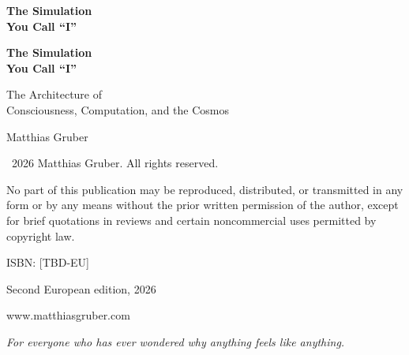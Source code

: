 \documentclass[11pt, twoside, openright]{book}
\makeatletter
\def\cleardoublepage{\clearpage\if@twoside \ifodd\c@page\else
  \thispagestyle{empty}\hbox{}\newpage
  \if@twocolumn\hbox{}\newpage\fi\fi\fi}
\makeatother
\begin{document}
\frontmatter
\pagestyle{empty}

\vspace*{3in}
\begin{center}
{\Huge\bfseries The Simulation\\[0.3cm] You Call ``I''\par}
\end{center}
\cleardoublepage

\vspace*{2in}
\begin{center}
{\Huge\bfseries The Simulation\\[0.3cm] You Call ``I''\par}
\vspace{0.8cm}
{\Large The Architecture of\\[0.2cm] Consciousness, Computation, and the Cosmos\par}
\vspace{2cm}
{\large Matthias Gruber\par}
\end{center}
\clearpage

\thispagestyle{empty}
\vspace*{\fill}
{\small
\noindent \textcopyright\ 2026 Matthias Gruber. All rights reserved.\par
\vspace{0.5cm}
\noindent No part of this publication may be reproduced, distributed, or transmitted
in any form or by any means without the prior written permission of the author,
except for brief quotations in reviews and certain noncommercial uses
permitted by copyright law.\par
\vspace{0.5cm}
\noindent ISBN: [TBD-EU]\par
\vspace{0.5cm}
\noindent Second European edition, 2026\par
\vspace{0.5cm}
\noindent www.matthiasgruber.com\par
}
\cleardoublepage

\thispagestyle{empty}
\vspace*{3in}
\begin{center}
\textit{For everyone who has ever wondered why anything feels like anything.}
\end{center}
\cleardoublepage
\end{document}
